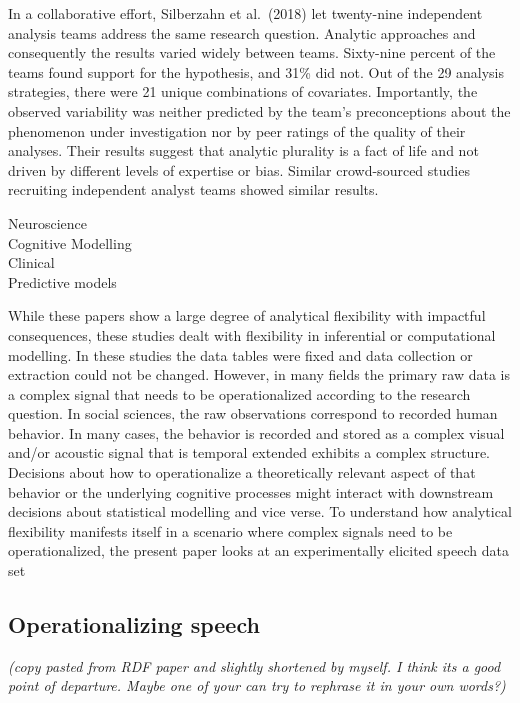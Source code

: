 \documentclass[
  english,
  man]{apa6}
\begin{document}
In a collaborative effort, Silberzahn et al.~(2018) let twenty-nine independent analysis teams address the same research question.
Analytic approaches and consequently the results varied widely between teams.
Sixty-nine percent of the teams found support for the hypothesis, and 31\% did not.
Out of the 29 analysis strategies, there were 21 unique combinations of covariates.
Importantly, the observed variability was neither predicted by the team's preconceptions about the phenomenon under investigation nor by peer ratings of the quality of their analyses.
Their results suggest that analytic plurality is a fact of life and not driven by different levels of expertise or bias.
Similar crowd-sourced studies recruiting independent analyst teams showed similar results.

Neuroscience\\
Cognitive Modelling\\
Clinical\\
Predictive models

While these papers show a large degree of analytical flexibility with impactful consequences, these studies dealt with flexibility in inferential or computational modelling.
In these studies the data tables were fixed and data collection or extraction could not be changed.
However, in many fields the primary raw data is a complex signal that needs to be operationalized according to the research question.
In social sciences, the raw observations correspond to recorded human behavior.
In many cases, the behavior is recorded and stored as a complex visual and/or acoustic signal that is temporal extended exhibits a complex structure.
Decisions about how to operationalize a theoretically relevant aspect of that behavior or the underlying cognitive processes might interact with downstream decisions about statistical modelling and vice verse.
To understand how analytical flexibility manifests itself in a scenario where complex signals need to be operationalized, the present paper looks at an experimentally elicited speech data set

\hypertarget{operationalizing-speech}{%
\subsection{Operationalizing speech}\label{operationalizing-speech}}

\emph{(copy pasted from RDF paper and slightly shortened by myself. I think its a good point of departure. Maybe one of your can try to rephrase it in your own words?)}
\end{document}
